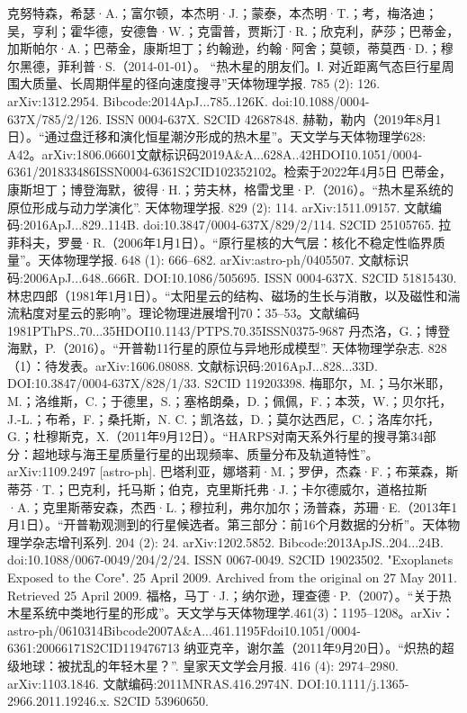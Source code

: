 \begin{enumerate}
 克努特森，希瑟·A.；富尔顿，本杰明·J.；蒙泰，本杰明·T.；考，梅洛迪；吴，亨利；霍华德，安德鲁·W.；克雷普，贾斯汀·R.；欣克利，萨莎；巴蒂金，加斯帕尔·A.；巴蒂金，康斯坦丁；约翰逊，约翰·阿舍；莫顿，蒂莫西·D.；穆尔黑德，菲利普·S.（2014-01-01）。 “热木星的朋友们。Ⅰ. 对近距离气态巨行星周围大质量、长周期伴星的径向速度搜寻”天体物理学报. 785 (2): 126. arXiv:1312.2954. Bibcode:2014ApJ...785..126K. doi:10.1088/0004-637X/785/2/126. ISSN 0004-637X. S2CID 42687848.
 赫勒，勒内（2019年8月1日）。“通过盘迁移和演化恒星潮汐形成的热木星”。天文学与天体物理学628: A42。arXiv:1806.06601文献标识码2019A&A...628A..42HDOI10.1051/0004-6361/201833486ISSN0004-6361S2CID102352102。检索于2022年4月5日
 巴蒂金，康斯坦丁；博登海默，彼得·H.；劳夫林，格雷戈里·P.（2016）。“热木星系统的原位形成与动力学演化”. 天体物理学报. 829 (2): 114. arXiv:1511.09157. 文献编码:2016ApJ...829..114B. doi:10.3847/0004-637X/829/2/114. S2CID 25105765.
 拉菲科夫，罗曼·R.（2006年1月1日）。“原行星核的大气层：核化不稳定性临界质量”。天体物理学报. 648 (1): 666–682. arXiv:astro-ph/0405507. 文献标识码:2006ApJ...648..666R. DOI:10.1086/505695. ISSN 0004-637X. S2CID 51815430.
 林忠四郎（1981年1月1日）。“太阳星云的结构、磁场的生长与消散，以及磁性和湍流粘度对星云的影响”。理论物理进展增刊70：35–53。文献编码1981PThPS..70...35HDOI10.1143/PTPS.70.35ISSN0375-9687
 丹杰洛，G.；博登海默，P.（2016）。“开普勒11行星的原位与异地形成模型”. 天体物理学杂志. 828（1）：待发表。arXiv:1606.08088. 文献标识码:2016ApJ...828...33D. DOI:10.3847/0004-637X/828/1/33. S2CID 119203398.
 梅耶尔，M.；马尔米耶，M.；洛维斯，C.；于德里，S.；塞格朗桑，D.；佩佩，F.；本茨，W.；贝尔托，J.-L.；布希，F.；桑托斯，N. C.；凯洛兹，D.；莫尔达西尼，C.；洛库尔托，G.；杜穆斯克，X.（2011年9月12日）。“HARPS对南天系外行星的搜寻第34部分：超地球与海王星质量行星的出现频率、质量分布及轨道特性”。arXiv:1109.2497 [astro-ph].
 巴塔利亚，娜塔莉·M.；罗伊，杰森·F.；布莱森，斯蒂芬·T.；巴克利，托马斯；伯克，克里斯托弗·J.；卡尔德威尔，道格拉斯·A.；克里斯蒂安森，杰西·L.；穆拉利，弗尔加尔；汤普森，苏珊·E.（2013年1月1日）。“开普勒观测到的行星候选者。第三部分：前16个月数据的分析”。天体物理学杂志增刊系列. 204 (2): 24. arXiv:1202.5852. Bibcode:2013ApJS..204...24B. doi:10.1088/0067-0049/204/2/24. ISSN 0067-0049. S2CID 19023502.
 "Exoplanets Exposed to the Core". 25 April 2009. Archived from the original on 27 May 2011. Retrieved 25 April 2009.
 福格，马丁·J.；纳尔逊，理查德·P.（2007）。“关于热木星系统中类地行星的形成”。天文学与天体物理学.461(3)：1195–1208。arXiv：astro-ph/0610314Bibcode2007A&A...461.1195Fdoi10.1051/0004-6361:20066171S2CID119476713
 纳亚克辛，谢尔盖（2011年9月20日）。“炽热的超级地球：被扰乱的年轻木星？”. 皇家天文学会月报. 416 (4): 2974–2980. arXiv:1103.1846. 文献编码:2011MNRAS.416.2974N. DOI:10.1111/j.1365-2966.2011.19246.x. S2CID 53960650.

\end{enumerate}

